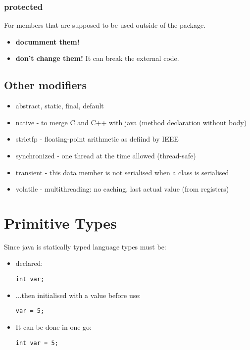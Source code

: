\documentclass{report}
\begin{document}
\subsection{protected}
For members that are supposed to be used outside of the package.
\begin{itemize}
	\item \textbf{documment them!}
	\item \textbf{don't change them!} It can break the external code.
\end{itemize} 


\section{Other modifiers}
\begin{itemize}
	\item abstract, static, final, default
	\item native - to merge C and C++ with java (method declaration without body)
	\item strictfp - floating-point arithmetic as defiind by IEEE
	\item synchronized - one thread at the time allowed (thread-safe)
	\item transient - this data member is not serialised when a class is serialised
	\item volatile - multithreading: no caching, last actual value (from registers)
\end{itemize}



\chapter{Primitive Types}
Since java is statically typed language types must be:
\begin{itemize}
\item declared:
\begin{verbatim}
int var;
\end{verbatim}
\item ...then initialised with a value before use:
\begin{verbatim}
var = 5;
\end{verbatim}
\item It can be done in one go:
\begin{verbatim}
int var = 5;
\end{verbatim}
\end{itemize}
\end{document}
